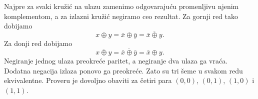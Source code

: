 
Najpre za svaki kružić na ulazu zamenimo odgovarajuću promenljivu njenim komplementom, a za izlazni kružić negiramo ceo rezultat. Za gornji red tako dobijamo
\[
x\oplus y=\bar{x}\oplus\bar{y}
  =\overline{\bar{x}\oplus y}.
\]
Za donji red dobijamo
\[
\overline{x\oplus y}
 =\overline{\bar{x}\oplus\bar{y}}
 =\bar{x}\oplus y.
\]
Negiranje jednog ulaza preokreće paritet, a negiranje dva ulaza ga vraća. Dodatna negacija izlaza ponovo ga preokreće. Zato su tri šeme u svakom redu ekvivalentne. Proveru je dovoljno obaviti za četiri para \((0,0)\), \((0,1)\), \((1,0)\) i \((1,1)\).
